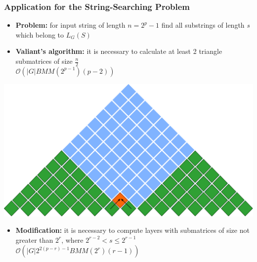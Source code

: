 \documentclass[xcolor=table]{beamer}
\begin{document}
\begin{frame}[fragile] \frametitle{Application for the String-Searching Problem}

    \begin{itemize}
      \item \textbf{Problem:} for input string of length $n = 2^p - 1$ find all substrings of length \textit{s} which belong to $L_G(S)$
      \item \textbf{Valiant's algorithm:} it is necessary to calculate at least 2 triangle submatrices of size $\frac{n}{2}$ \\ 
      $\mathcal{O}(|G|BMM(2^{p - 1})(p - 2))$
    \end{itemize}

    \centering\includegraphics[width = 0.5\linewidth]{pic/valsubstring3.pdf}


    \pause
    \begin{itemize}
      \item  \textbf{Modification:} it is necessary to compute layers with submatrices of size not greater than $2^r$, where $2^{r-2} < s \le 2^{r - 1}$ \\
      $\mathcal{O}(|G|2^{2(p - r) - 1}BMM(2^{r})(r - 1))$
  \end{itemize}

\end{frame}
\end{document}

